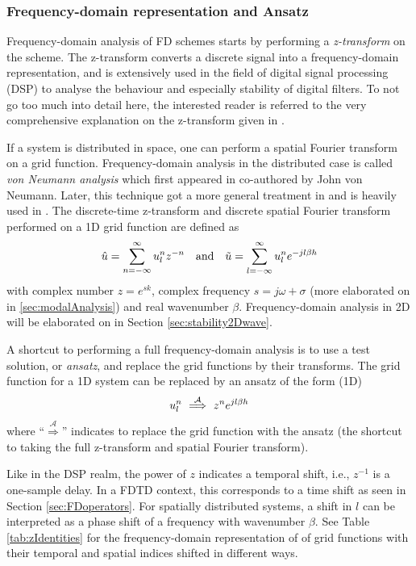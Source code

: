 \subsubsection{Frequency-domain representation and Ansatz}
Frequency-domain analysis of FD schemes starts by performing a \textit{z-transform} on the scheme. The z-transform converts a discrete signal into a frequency-domain representation, and is extensively used in the field of digital signal processing (DSP) to analyse the behaviour and especially stability of digital filters. To not go too much into detail here, the interested reader is referred to the very comprehensive explanation on the z-transform given in \cite[Ch. 5]{Park2010}. 

If a system is distributed in space, one can perform a spatial Fourier transform on a grid function. Frequency-domain analysis in the distributed case is called \textit{von Neumann analysis} which first appeared in \cite{vonNeumann} co-authored by John von Neumann. Later, this technique got a more general treatment in \cite{Strikwerda1989} and is heavily used in \cite{theBible}. The discrete-time z-transform and discrete spatial Fourier transform performed on a 1D grid function are defined as \cite{theBible}
\begin{equation}
    \hat u  = \sum_{n=-\infty}^\infty u_l^n z^{-n}\quad \text{and} \quad \tilde u = \sum_{l=-\infty}^\infty u_l^n e^{-jl\beta h}
\end{equation}
with complex number $z = e^{sk}$, complex frequency $s=j\omega + \sigma$ (more elaborated on in \ref{sec:modalAnalysis}) and real wavenumber $\beta$. Frequency-domain analysis in 2D will be elaborated on in Section \ref{sec:stability2Dwave}.

A shortcut to performing a full frequency-domain analysis is to use a test solution, or \textit{ansatz}, and replace the grid functions by their transforms. The grid function for a 1D system can be replaced by an ansatz of the form (1D) \cite{Strikwerda1989}
\begin{equation}\label{eq:ansatz}
    u_l^n \ \overset{\mathcal{A}}{\Longrightarrow}\  z^n e^{jl\beta h}
\end{equation} 
where ``$\overset{\mathcal{A}}{\Longrightarrow}$'' indicates to replace the grid function with the ansatz (the shortcut to taking the full z-transform and spatial Fourier transform). 

Like in the DSP realm, the power of $z$ indicates a temporal shift, i.e., $z^{-1}$ is a one-sample delay. In a FDTD context, this corresponds to a time shift as seen in Section \ref{sec:FDoperators}. For spatially distributed systems, a shift in $l$ can be interpreted as a phase shift of a frequency with wavenumber $\beta$.  See Table \ref{tab:zIdentities} for the frequency-domain representation of of grid functions with their temporal and spatial indices shifted in different ways. 


